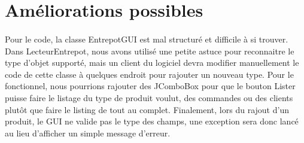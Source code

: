 \documentclass[11pt, french]{article} %
\begin{document}
\section{Améliorations possibles}
\paragraph{}
Pour le code, la classe EntrepotGUI est mal structuré et difficile à si trouver. Dans LecteurEntrepot, nous avons utilisé une petite astuce pour reconnaitre le type d'objet supporté, mais un client du logiciel devra modifier manuellement le code de cette classe à quelques endroit pour rajouter un nouveau type. Pour le fonctionnel, nous pourrions rajouter des JComboBox pour que le bouton Lister puisse faire le listage du type de produit voulut, des commandes ou des clients plutôt que faire le listing de tout au complet. Finalement, lors du rajout d'un produit, le GUI ne valide pas le type des champs, une exception sera donc lancé au lieu d'afficher un simple message d'erreur.
\end{document}

